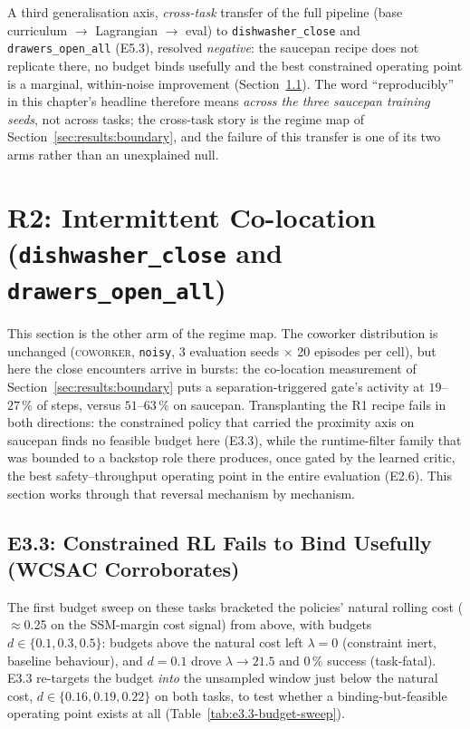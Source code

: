 \documentclass[11pt,a4paper]{report}
\newcommand{\ssm}{SSM}
\newcommand{\coworker}{\textsc{coworker}}
\begin{document}
A third generalisation axis, \emph{cross-task} transfer of the full
pipeline (base curriculum $\rightarrow$ Lagrangian $\rightarrow$
eval) to \texttt{dishwasher\_close} and \texttt{drawers\_open\_all}
(E5.3), resolved \emph{negative}: the saucepan recipe does not
replicate there, no budget binds usefully and the best constrained
operating point is a marginal, within-noise improvement
(Section~\ref{sec:results:r2-lagrangian}). The word
``reproducibly'' in this chapter's headline therefore means
\emph{across the three saucepan training seeds}, not across tasks;
the cross-task story is the regime map of
Section~\ref{sec:results:boundary}, and the failure of this transfer
is one of its two arms rather than an unexplained null.

\section{R2: Intermittent Co-location (\texttt{dishwasher\_close} and \texttt{drawers\_open\_all})}
\label{sec:results:r2}

This section is the other arm of the regime map. The coworker
distribution is unchanged (\coworker{}, \texttt{noisy}, 3 evaluation
seeds $\times$ 20 episodes per cell), but here the close encounters
arrive in bursts: the co-location measurement of
Section~\ref{sec:results:boundary} puts a separation-triggered
gate's activity at $19$--$27\,\%$ of steps, versus $51$--$63\,\%$ on
saucepan. Transplanting the R1 recipe fails in both directions: the
constrained policy that carried the proximity axis on saucepan finds
no feasible budget here (E3.3), while the runtime-filter family that
was bounded to a backstop role there produces, once gated by the
learned critic, the best safety--throughput operating point in the
entire evaluation (E2.6). This section works through that reversal
mechanism by mechanism.

\subsection{E3.3: Constrained RL Fails to Bind Usefully (WCSAC Corroborates)}
\label{sec:results:r2-lagrangian}

The first budget sweep on these tasks bracketed the policies' natural
rolling cost ($\approx$0.25 on the \ssm{}-margin cost signal) from
above, with budgets $d \in \{0.1, 0.3, 0.5\}$: budgets above the
natural cost left $\lambda = 0$ (constraint inert, baseline
behaviour), and $d = 0.1$ drove $\lambda \to 21.5$ and $0\,\%$
success (task-fatal). E3.3 re-targets the budget \emph{into} the
unsampled window just below the natural cost,
$d \in \{0.16, 0.19, 0.22\}$ on both tasks, to test whether a
binding-but-feasible operating point exists at all
(Table~\ref{tab:e3.3-budget-sweep}).
\end{document}

